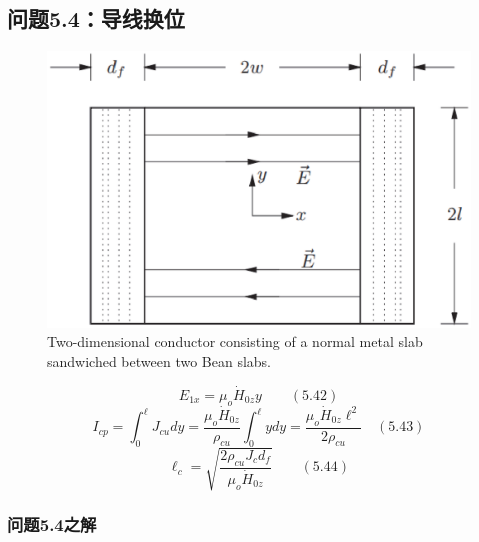 \subsection{问题5.4：导线换位}


\begin{figure}
	\centering
	\includegraphics[scale=0.8]{chpt5/figs/fig5.20.eps}
	\caption{Two-dimensional conductor consisting of a normal
		metal slab sandwiched between two Bean slabs.}
\end{figure}



\begin{equation}%
E_{1x}=\mu_{o}\dot{H}_{0z}y\qquad(5.42)
\end{equation}
\begin{equation}%
I_{cp}=\int_{0}^{\ell}J_{cu}dy=\frac{\mu_{o}\dot{H}_{0z}}{\rho_{cu}}\int_{0}^{\ell}ydy=\frac{\mu_{o}\dot{H}_{0z}\ell^{2}}{2\rho_{cu}}\quad(5.43)
\end{equation}
\begin{equation}%
\ell_{c}=\sqrt{\frac{2\rho_{cu}J_{c}d_{f}}{\mu_{o}\dot{H}_{0z}}}\qquad(5.44)
\end{equation}


\subsubsection{问题5.4之解}

